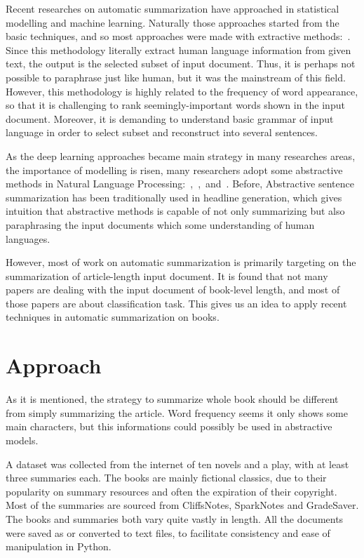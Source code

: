 Recent researches on automatic summarization have approached in statistical
modelling and machine learning. Naturally those approaches started from the
basic techniques, and so most approaches were made with extractive
methods:~\cite{2017arXiv170804439V}. Since this methodology literally extract
human language information from given text, the output is the selected subset
of input document. Thus, it is perhaps not possible to paraphrase just like
human, but it was the mainstream of this field. However, this methodology is
highly related to the frequency of word appearance, so that it is challenging
to rank seemingly-important words shown in the input document. Moreover, it is
demanding to understand basic grammar of input language in order to select
subset and reconstruct into several sentences.

As the deep learning approaches became main strategy in many researches areas,
the importance of modelling is risen, many researchers adopt some abstractive
methods in Natural Language
Processing:~\cite{2016arXiv160206023N},~\cite{2017arXiv170404368S},~and~\cite{Rush2015}.
Before, Abstractive sentence summarization has been traditionally used in
headline generation, which gives intuition that abstractive methods is capable
of not only summarizing but also paraphrasing the input documents which some
understanding of human languages. 

However, most of work on automatic summarization is primarily targeting on
the summarization of article-length input document. It is found that not many
papers are dealing with the input document of book-level length, and most of
those papers are about classification task. This gives us an idea to apply
recent techniques in automatic summarization on books.


\section{Approach}
As it is mentioned, the strategy to summarize whole book should be different
from simply summarizing the article. Word frequency seems it only shows some
main characters, but this informations could possibly be used in abstractive
models. 

A dataset was collected from the internet of ten novels and a play, with at
least three summaries each. The books are mainly fictional classics, due to
their popularity on summary resources and often the expiration of their
copyright. Most of the summaries are sourced from CliffsNotes, SparkNotes and
GradeSaver. The books and summaries both vary quite vastly in length. All the
documents were saved as or converted to text files, to facilitate consistency
and ease of manipulation in Python.

